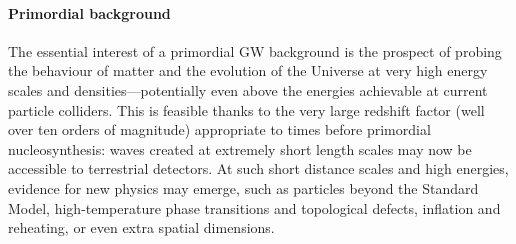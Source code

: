 \paragraph{Primordial background}
The essential interest of a primordial GW background is the prospect 
of probing the behaviour of matter and the evolution of the Universe 
at very high energy scales and densities---potentially even above the 
energies achievable at current particle colliders. This is feasible 
thanks to the very large redshift factor (well over ten orders of 
magnitude) appropriate to times before primordial nucleosynthesis: 
waves created at extremely short length scales may now be accessible 
to terrestrial detectors. At such short distance scales and high 
energies, evidence for new physics may emerge, such as particles 
beyond the Standard Model, high-temperature phase transitions and 
topological defects, inflation and reheating, or even extra spatial 
dimensions.  


